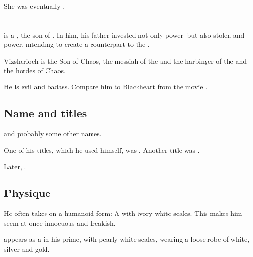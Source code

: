She was eventually . 















\section{\Vizsherioch}
\index{\Vizsherioch}
\Vizsherioch{} is a \dragon, the son of \Secherdamon. 
In him, his father invested not only \draconic{} power, but also stolen \bane{} and \resphan{} power, intending to create a \draconic{} counterpart to the \satharioth. 

Vizsherioch is the Son of Chaos, the messiah of the \dragons and the harbinger of the \xs and the hordes of Chaos. 

He is evil and badass. 
Compare him to Blackheart from the movie \cite{Movie:GhostRider}.









\subsection{Name and titles}
\Vizsherioch and probably some other names. 

One of his titles, which he used himself, was . 
Another title was .

Later,  . 









\subsection{Physique}
He often takes on a humanoid form: 
A \scatha{} with ivory white scales. 
This makes him seem at once innocuous and freakish. 

\Vizsherioch appears as a \dax in his prime, with pearly white scales, wearing a loose robe of white, silver and gold. 

